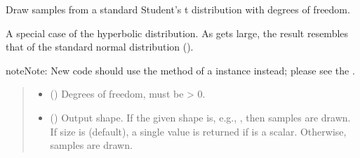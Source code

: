 \documentclass[letterpaper,10pt,english]{sphinxmanual}
\begin{document}
\begin{fulllineitems}
\label{\detokenize{metilda.controllers:metilda.controllers.pitch_art_wizard.standard_t}}
\pysigstartsignatures
{}
\pysigstopsignatures
\sphinxAtStartPar
Draw samples from a standard Student’s t distribution with  degrees
of freedom.

\sphinxAtStartPar
A special case of the hyperbolic distribution.  As  gets
large, the result resembles that of the standard normal
distribution ().

\begin{sphinxadmonition}{note}{Note:}
\sphinxAtStartPar
New code should use the 
method of a  instance instead;
please see the .
\end{sphinxadmonition}
\begin{quote}\begin{description}
\begin{itemize}
\item {} 
\sphinxAtStartPar
{} () \textendash{} Degrees of freedom, must be \textgreater{} 0.

\item {} 
\sphinxAtStartPar
{} (\sphinxstyleliteralemphasis{\sphinxupquote{, }}) \textendash{} Output shape.  If the given shape is, e.g., , then
 samples are drawn.  If size is  (default),
a single value is returned if  is a scalar.  Otherwise,
 samples are drawn.


\end{itemize}
\end{description}
\end{quote}
\end{fulllineitems}
\end{document}
